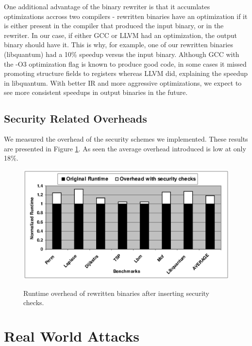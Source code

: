 One additional advantage of the binary rewriter is that it accumlates optimizations accross two
compilers - rewritten binaries have an optimization if it is either present in the compiler that
produced the input binary, or in the rewriter. In our case, if either GCC or LLVM had an
optimization, the output binary should have it. This is why, for example, one of our rewritten
binaries (libquantum) had a 10\% speedup versus the input binary. Although GCC with the -O3
optimization flag is known to produce good code, in some cases it missed promoting structure fields
to registers whereas LLVM did, explaining the speedup in libquantum. With better IR and more
aggressive optimizations, we expect to see more consistent speedups in output binaries in the
future.

\subsection{Security Related Overheads}

We measured the overhead of the security schemes we implemented. These results are presented in
Figure \ref{secoverhead}. As seen the average overhead introduced is low at only 18\%. 

\begin{figure}
\begin{center}
\includegraphics{security1.eps}
\end{center}
\renewcommand{\baselinestretch}{1}
\small\normalsize
\begin{quote}
\caption{Runtime overhead of rewritten binaries after inserting security checks.}
\label{secoverhead}
\end{quote}
\end{figure}
\renewcommand{\baselinestretch}{2}
\small\normalsize

\section{Real World Attacks}

